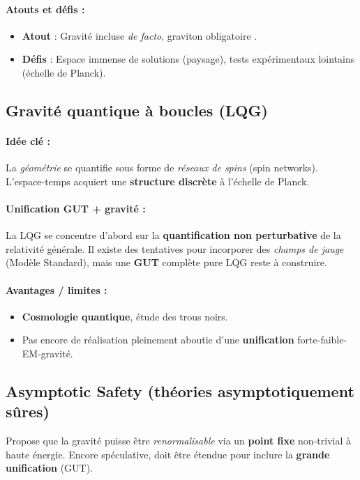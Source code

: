 \documentclass[12pt]{article}
\begin{document}
\paragraph{Atouts et défis :}
\begin{itemize}
\item \textbf{Atout} : Gravité incluse \emph{de facto}, graviton \og obligatoire \fg.  
\item \textbf{Défis} : Espace immense de solutions (paysage), tests expérimentaux lointains (échelle de Planck).  
\end{itemize}

\subsection{Gravité quantique à boucles (LQG)}
\label{sec:LQG}
\paragraph{Idée clé :}
La \emph{géométrie} se quantifie sous forme de \emph{réseaux de spins} (spin networks).  
L'espace-temps acquiert une \textbf{structure discrète} à l'échelle de Planck.

\paragraph{Unification GUT + gravité :}
La LQG se concentre d'abord sur la \textbf{quantification non perturbative} de la relativité générale.  
Il existe des tentatives pour incorporer des \emph{champs de jauge} (Modèle Standard), 
mais une \textbf{GUT} complète \og pure LQG \fg{} reste à construire.

\paragraph{Avantages / limites :}
\begin{itemize}
\item \textbf{Cosmologie quantique}, étude des trous noirs.  
\item Pas encore de réalisation pleinement aboutie d'une \textbf{unification} forte-faible-EM-gravité.
\end{itemize}

\subsection{Asymptotic Safety (théories asymptotiquement sûres)}
Propose que la gravité puisse être \emph{renormalisable} via un \textbf{point fixe} non-trivial 
à haute énergie.  
Encore spéculative, doit être étendue pour inclure la \textbf{grande unification} (GUT).
\end{document}
